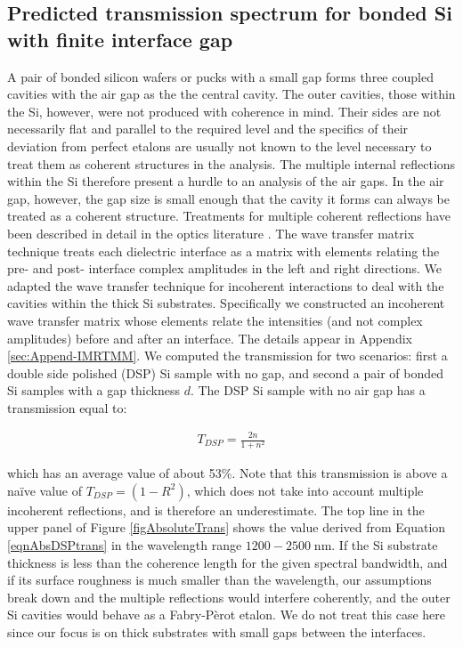 \documentclass[osajnl,preprint,showpacs,superscriptaddress,12pt]{revtex4-1} %
\begin{document}
\subsection{Predicted transmission spectrum for bonded Si with finite interface gap}
\label{secTheory}
A pair of bonded silicon wafers or pucks with a small gap forms three coupled cavities with the air gap as the the central cavity.  The outer cavities, those within the Si, however, were not produced with coherence in mind.  Their sides are not necessarily flat and parallel to the required level and the specifics of their deviation from perfect etalons are usually not known to the level necessary to treat them as coherent structures in the analysis.  The multiple internal reflections within the Si therefore present a hurdle to an analysis of the air gaps.  In the air gap, however, the gap size is small enough that the cavity it forms can always be treated as a coherent structure.  Treatments for multiple coherent reflections have been described in detail in the optics literature \cite{2007fuph.book.....S}.  The wave transfer matrix technique treats each dielectric interface as a matrix with elements relating the pre- and post- interface complex amplitudes in the left and right directions.  We adapted the wave transfer technique for incoherent interactions \cite{2002ApOpt..41.3978K} to deal with the cavities within the thick Si substrates.  Specifically we constructed an incoherent wave transfer matrix whose elements relate the intensities (and not complex amplitudes) before and after an interface.  The details appear in Appendix \ref{sec:Append-IMRTMM}.  We computed the transmission for two scenarios: first a double side polished (DSP) Si sample with no gap, and second a pair of bonded Si samples with a gap thickness $d$.  The DSP Si sample with no air gap has a transmission equal to:

\begin{eqnarray}
T_{DSP} = \frac{2n}{1+n^2} \label{eqnAbsDSPtrans}
\end{eqnarray}

which has an average value of about 53\%.  Note that this transmission is above a na\"ive value of $T_{DSP}=(1-R^2)$, which does not take into account multiple incoherent reflections, and is therefore an underestimate.  The top line in the upper panel of Figure \ref{figAbsoluteTrans} shows the value derived from Equation \ref{eqnAbsDSPtrans} in the wavelength range $1200-2500\;$nm.  If the Si substrate thickness is less than the coherence length for the given spectral bandwidth, and if its surface roughness is much smaller than the wavelength, our assumptions break down and the multiple reflections would interfere coherently, and the outer Si cavities would behave as a Fabry-P\`erot etalon.  We do not treat this case here since our focus is on thick substrates with small gaps between the interfaces.
\end{document}
